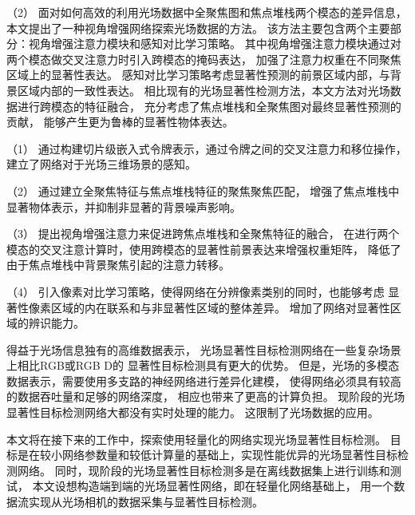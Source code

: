 %
%
（2）
%
%
面对如何高效的利用光场数据中全聚焦图和焦点堆栈两个模态的差异信息，
本文提出了一种视角增强网络探索光场数据的方法。
该方法主要包含两个主要部分：视角增强注意力模块和感知对比学习策略。
其中视角增强注意力模块通过对两个模态做交叉注意力时引入跨模态的掩码表达，
加强了注意力权重在不同聚焦区域上的显著性表达。
感知对比学习策略考虑显著性预测的前景区域内部，与背景区域内部的一致性表达。
相比现有的光场显著性检测方法，本文方法对光场数据进行跨模态的特征融合，
充分考虑了焦点堆栈和全聚焦图对最终显著性预测的贡献，
能够产生更为鲁棒的显著性物体表达。




%
%
%
%


（1）
通过构建切片级嵌入式令牌表示，通过令牌之间的交叉注意力和移位操作，
建立了网络对于光场三维场景的感知。


（2）
通过建立全聚焦特征与焦点堆栈特征的聚焦聚焦匹配，
增强了焦点堆栈中显著物体表示，并抑制非显著的背景噪声影响。


（3）
提出视角增强注意力来促进跨焦点堆栈和全聚焦特征的融合，
在进行两个模态的交叉注意计算时，使用跨模态的显著性前景表达来增强权重矩阵，
降低了由于焦点堆栈中背景聚焦引起的注意力转移。


（4）
引入像素对比学习策略，使得网络在分辨像素类别的同时，也能够考虑
显著性像素区域的内在联系和与非显著性区域的整体差异。
增加了网络对显著性区域的辨识能力。



%
%
%

得益于光场信息独有的高维数据表示，
光场显著性目标检测网络在一些复杂场景上相比RGB或RGB D的
显著性目标检测具有更大的优势。
但是，光场的多模态数据表示，需要使用多支路的神经网络进行差异化建模，
使得网络必须具有较高的数据吞吐量和足够的网络深度，
相应也带来了更高的计算负担。
现阶段的光场显著性目标检测网络大都没有实时处理的能力。
这限制了光场数据的应用。

本文将在接下来的工作中，探索使用轻量化的网络实现光场显著性目标检测。
目标是在较小网络参数量和较低计算量的基础上，实现性能优异的光场显著性目标检测网络。
同时，现阶段的光场显著性目标检测多是在离线数据集上进行训练和测试，
本文设想构造端到端的光场显著性网络，即在轻量化网络基础上，
用一个数据流实现从光场相机的数据采集与显著性目标检测。





















